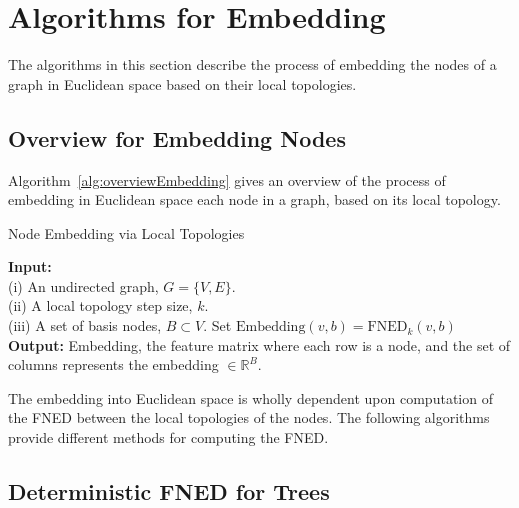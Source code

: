 \documentclass{article}
\begin{document}
\section{Algorithms for Embedding}
\label{sec:algos}
The algorithms in this section describe the process of embedding the nodes of a graph in Euclidean space based on their local topologies.

\subsection{Overview for Embedding Nodes}
Algorithm~\ref{alg:overviewEmbedding} gives an overview of the process of embedding in Euclidean space each node in a graph, based on its local topology.

\begin{algorithm}[h!tbp]
\caption{Node Embedding via Local Topologies}
\label{alg:overviewEmbedding}
\begin{algorithmic}[1]
\STATE \textbf{Input:} \\(i) An undirected graph, $G = \{V,E\}$.\\(ii) A local topology step size, $k$.\\(iii) A set of basis nodes, $B \subset V$.
\STATE Set $\text{Embedding}(v,b) = \text{FNED}_{k}(v,b)$
\ENDFOR
\ENDFOR
\STATE \textbf{Output:} Embedding, the feature matrix where each row is a node, and the set of columns represents the embedding $\in \mathbb{R}^{B}$.
\end{algorithmic}
\end{algorithm}

The embedding into Euclidean space is wholly dependent upon computation of the FNED between the local topologies of the nodes. The following algorithms provide different methods for computing the FNED.


\subsection{Deterministic FNED for Trees}
\end{document}
